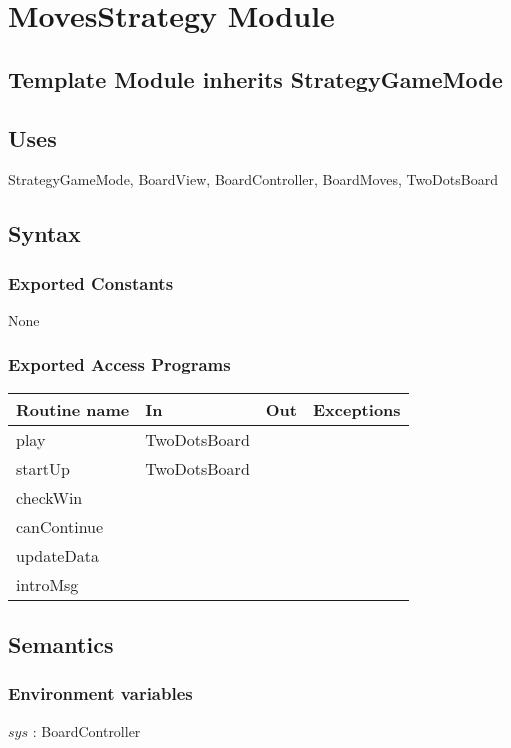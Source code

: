 \documentclass[12pt]{article}
\begin{document}
\newpage

\section* {MovesStrategy Module}

\subsection* {Template Module inherits StrategyGameMode}


\subsection{Uses}
StrategyGameMode, BoardView, BoardController, BoardMoves, TwoDotsBoard

\subsection* {Syntax}

\subsubsection* {Exported Constants}

None

\subsubsection* {Exported Access Programs}

\begin{tabular}{| l | l | l | p{6cm} |}
\hline
\textbf{Routine name} & \textbf{In} & \textbf{Out} & \textbf{Exceptions}\\
\hline
play & TwoDotsBoard & & \\
\hline
startUp & TwoDotsBoard & & \\
\hline
checkWin & & & \\
\hline
canContinue &  & & \\
\hline
updateData &  & & \\
\hline
introMsg & & & \\
\hline
\end{tabular}

\subsection* {Semantics}

\subsubsection* {Environment variables}
\noindent $sys$ : BoardController
\end{document}
